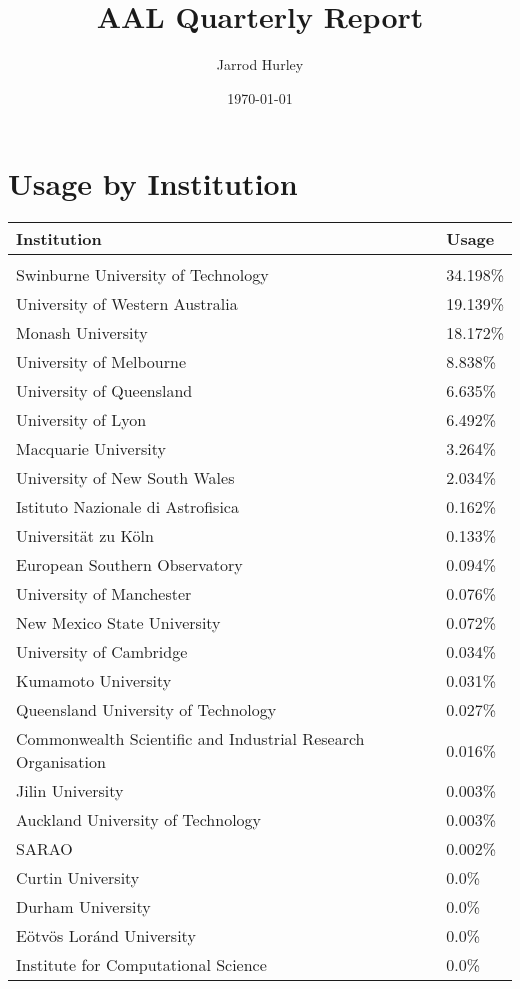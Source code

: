 \documentclass{article}%
\title{AAL Quarterly Report}%
\author{Jarrod Hurley}%
\date{\today}%
\begin{document}
%
\normalsize%
\maketitle%
\newpage%
\section{Usage by Institution }%

%
\begin{longtabu}{X[l] X[r]}%
\textbf{Institution}&\textbf{Usage}\\%
\hline%
&\\%
Swinburne University of Technology&34.198\%\\%
\hline%
University of Western Australia&19.139\%\\%
\hline%
Monash University&18.172\%\\%
\hline%
University of Melbourne&8.838\%\\%
\hline%
University of Queensland&6.635\%\\%
\hline%
University of Lyon&6.492\%\\%
\hline%
Macquarie University&3.264\%\\%
\hline%
University of New South Wales&2.034\%\\%
\hline%
Istituto Nazionale di Astrofisica&0.162\%\\%
\hline%
Universität zu Köln&0.133\%\\%
\hline%
European Southern Observatory&0.094\%\\%
\hline%
University of Manchester&0.076\%\\%
\hline%
New Mexico State University&0.072\%\\%
\hline%
University of Cambridge&0.034\%\\%
\hline%
Kumamoto University&0.031\%\\%
\hline%
Queensland University of Technology&0.027\%\\%
\hline%
Commonwealth Scientific and Industrial Research Organisation&0.016\%\\%
\hline%
Jilin University&0.003\%\\%
\hline%
Auckland University of Technology&0.003\%\\%
\hline%
SARAO&0.002\%\\%
\hline%
Curtin University&0.0\%\\%
\hline%
Durham University&0.0\%\\%
\hline%
Eötvös Loránd University&0.0\%\\%
\hline%
Institute for Computational Science&0.0\%\\%

\end{longtabu}
\end{document}
